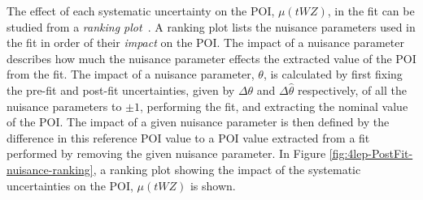 The effect of each systematic uncertainty on the POI, $\mu (tWZ)$, in the fit can be studied from a \textit{ranking plot}~\cite{stats-at-atlas-cms-slides}. A ranking plot lists the nuisance parameters used in the fit in order of their \textit{impact} on the POI. The impact of a nuisance parameter describes how much the nuisance parameter effects the extracted value of the POI from the fit. The impact of a nuisance parameter, $\theta$, is calculated by first fixing the pre-fit and post-fit uncertainties, given by $\Delta \theta$ and $\Delta \hat{\theta}$ respectively, of all the nuisance parameters to $\pm 1$, performing the fit, and extracting the nominal value of the POI. The impact of a given nuisance parameter is then defined by the difference in this reference POI value to a POI value extracted from a fit performed by removing the given nuisance parameter. In Figure \ref{fig:4lep-PostFit-nuisance-ranking}, a ranking plot showing the impact of the systematic uncertainties on the POI, $\mu (tWZ)$ is shown.
